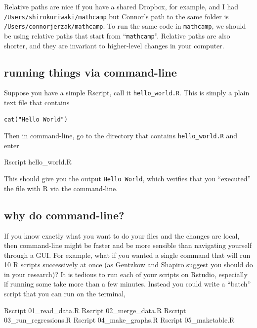 \documentclass[]{book}
\newenvironment{Shaded}{\begin{snugshade}}{\end{snugshade}}
\newcommand{\ExtensionTok}[1]{#1}
\newcommand{\NormalTok}[1]{#1}
\theoremstyle{definition}
\theoremstyle{definition}
\theoremstyle{definition}
\theoremstyle{remark}
\begin{document}
Relative paths are nice if you have a shared Dropbox, for example, and I had \texttt{/Users/shirokuriwaki/mathcamp} but Connor's path to the same folder is \texttt{/Users/connorjerzak/mathcamp}. To run the same code in \texttt{mathcamp}, we should be using relative paths that start from ``\texttt{mathcamp}''. Relative paths are also shorter, and they are invariant to higher-level changes in your computer.

\hypertarget{running-things-via-command-line}{%
\subsection{running things via command-line}\label{running-things-via-command-line}}

Suppose you have a simple Rscript, call it \texttt{hello\_world.R}. This is simply a plain text file that contains

\begin{verbatim}
cat("Hello World")
\end{verbatim}

Then in command-line, go to the directory that contains \texttt{hello\_world.R} and enter

\begin{Shaded}
\begin{Highlighting}[]
\ExtensionTok{Rscript}\NormalTok{ hello_world.R}
\end{Highlighting}
\end{Shaded}

This should give you the output \texttt{Hello\ World}, which verifies that you ``executed'' the file with R via the command-line.

\hypertarget{why-do-command-line}{%
\subsection{why do command-line?}\label{why-do-command-line}}

If you know exactly what you want to do your files and the changes are local, then command-line might be faster and be more sensible than navigating yourself through a GUI. For example, what if you wanted a single command that will run 10 R scripts successively at once (as Gentzkow and Shapiro suggest you should do in your research)? It is tedious to run each of your scripts on Rstudio, especially if running some take more than a few minutes. Instead you could write a ``batch'' script that you can run on the terminal,

\begin{Shaded}
\begin{Highlighting}[]
\ExtensionTok{Rscript}\NormalTok{ 01_read_data.R}
\ExtensionTok{Rscript}\NormalTok{ 02_merge_data.R}
\ExtensionTok{Rscript}\NormalTok{ 03_run_regressions.R}
\ExtensionTok{Rscript}\NormalTok{ 04_make_graphs.R}
\ExtensionTok{Rscript}\NormalTok{ 05_maketable.R}
\end{Highlighting}
\end{Shaded}
\end{document}

